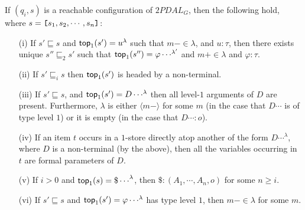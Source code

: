 
\begin{lemma}\label{lem:main} If $(q_i,s)$ is a reachable configuration of $2PDAL_G$, then the following hold, where $s = \hbox{\tt [}{s_1, s_2,
\cdots, s_n}\hbox{\tt ]}$:
\begin{enumerate}
\item[(i)] If $s' \sqsubseteq s$ and ${\sf top}_1(s') = u^\lambda$
such that $m- \in \lambda$, and $u : \tau$, then there exists
unique $s'' \sqsubseteq_2 s'$ such that ${\sf top}_1(s'') = {\varphi
\cdots}^{\lambda'}$ and $m+ \in \lambda$ and $\varphi : \tau$.


\item[(ii)] If $s' \sqsubseteq_i s$ then ${\sf top}_1(s')$ is headed by
a non-terminal.

\item[(iii)] \label{level1} If $s' \sqsubseteq s$, and
${\sf top}_1(s') = D \cdots^\lambda$ then all level-$1$ arguments of
$D$ are present. Furthermore, $\lambda$ is either $\langle m-
\rangle$ for some $m$ (in the case that $D \cdots $ is of type
level $1$) or it is empty (in the case that $D \cdots : o$).

\item[(iv)] \label{fps} If an item $t$ occurs in a $1$-store
directly atop another of the form $D \cdots^\lambda$, where $D$ is
a non-terminal (by the above), then all the variables occurring in
$t$ are formal parameters of $D$.

\item[(v)] \label{rightnum} If $i > 0$ and ${\sf top}_1(s) = {\$
\cdots }^\lambda$, then  $\$ : (A_1, \cdots, A_n, o)$ for some $n
\geq i$.


\item[(vi)] \label{musthavelabel} If $s' \sqsubseteq s$ and
${\sf top}_1(s') = {\varphi \cdots}^\lambda$ has type level $1$, then
$m- \in \lambda$ for some $m$.



%
\end{enumerate}
\end{lemma}

